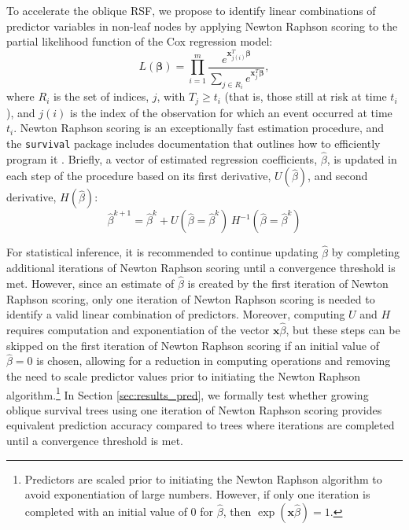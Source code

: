 \documentclass[twoside,11pt]{article}\usepackage[]{graphicx}\usepackage[]{xcolor}
\newcommand{\ie}{that is}
\newcommand{\secref}[1]{Section \ref{#1}}
\begin{document}
To accelerate the oblique RSF, we propose to identify linear combinations of predictor variables in non-leaf nodes by applying Newton Raphson scoring to the partial likelihood function of the Cox regression model:
\begin{equation}\label{eqn:cox-partial-likelihood}
L(\bm\beta) = \prod_{i=1}^m \frac{e^{\bm{x}_{j(i)}^T \bm\beta}}{\sum_{j \in R_i} e^{\bm{x}_j^T \bm\beta}},
\end{equation}
where $R_i$ is the set of indices, $j$, with $T_j \geq t_i$ (\ie, those still at risk at time $t_i$), and $j(i)$ is the index of the observation for which an event occurred at time $t_i$. Newton Raphson scoring is an exceptionally fast estimation procedure, and the \texttt{survival} package \citep{survival} includes documentation that outlines how to efficiently program it \citep{therneau_survival_2022}. Briefly, a vector of estimated regression coefficients, $\hat{\beta}$, is updated in each step of the procedure based on its first derivative, $U(\hat{\beta})$, and second derivative, $H(\hat{\beta})$:
$$ \hat{\beta}^{k+1} =  \hat{\beta}^{k} + U(\hat{\beta} = \hat{\beta}^{k})\, H^{-1}(\hat{\beta} = \hat{\beta}^{k}) $$

For statistical inference, it is recommended to continue updating $\hat{\beta}$ by completing additional iterations of Newton Raphson scoring until a convergence threshold is met. However, since an estimate of $\hat{\beta}$ is created by the first iteration of Newton Raphson scoring, only one iteration of Newton Raphson scoring is needed to identify a valid linear combination of predictors. Moreover, computing $U$ and $H$ requires computation and exponentiation of the vector $\bm{x}\hat{\beta}$, but these steps can be skipped on the first iteration of Newton Raphson scoring if an initial value of $\hat{\beta} = 0$ is chosen, allowing for a reduction in computing operations and removing the need to scale predictor values prior to initiating the Newton Raphson algorithm.\footnote{Predictors are scaled prior to initiating the Newton Raphson algorithm to avoid exponentiation of large numbers. However, if only one iteration is completed with an initial value of 0 for $\hat{\beta}$, then $\exp(\bm{x}\hat{\beta}) = 1$.} In \secref{sec:results_pred}, we formally test whether growing oblique survival trees using one iteration of Newton Raphson scoring provides equivalent prediction accuracy compared to trees where iterations are completed until a convergence threshold is met.
\end{document}
